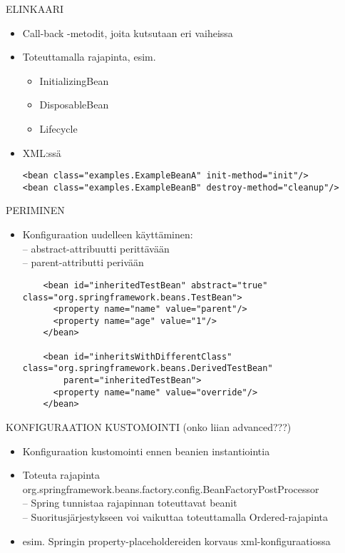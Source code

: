 \documentclass[hyperref={pdfauthor=\AUTHOR},14pt]{beamer}
\begin{document}
\begin{frame}[t, fragile]{ELINKAARI}
\begin{itemize}

 \item Call-back -metodit, joita kutsutaan eri vaiheissa
 \item Toteuttamalla rajapinta, esim.
\begin{itemize}
\item InitializingBean
\item DisposableBean
\item Lifecycle
\end{itemize}
 \item XML:ssä
\begin{lstlisting}
<bean class="examples.ExampleBeanA" init-method="init"/>
<bean class="examples.ExampleBeanB" destroy-method="cleanup"/>
\end{lstlisting}
\end{itemize}
\end{frame}
\begin{frame}[t, fragile]{PERIMINEN}
\begin{itemize}
 \item Konfiguraation uudelleen käyttäminen:\\
 -- abstract-attribuutti perittävään\\
 -- parent-attributti perivään   \\
\begin{lstlisting}
    <bean id="inheritedTestBean" abstract="true" class="org.springframework.beans.TestBean">
      <property name="name" value="parent"/>
      <property name="age" value="1"/>
    </bean>

    <bean id="inheritsWithDifferentClass" class="org.springframework.beans.DerivedTestBean"
        parent="inheritedTestBean">
      <property name="name" value="override"/>
    </bean>
\end{lstlisting}
\end{itemize}
\end{frame}
\begin{frame}[t, fragile]{KONFIGURAATION KUSTOMOINTI (onko liian advanced???)}
\begin{itemize}
 \item Konfiguraation kustomointi ennen beanien instantiointia
 \item Toteuta rajapinta org.springframework.beans.factory.config.BeanFactoryPostProcessor\\
 -- Spring tunnistaa rajapinnan toteuttavat beanit\\
 -- Suoritusjärjestykseen voi vaikuttaa toteuttamalla Ordered-rajapinta \\
 \item esim. Springin property-placeholdereiden korvaus xml-konfiguraatiossa 
\end{itemize}
\end{frame}
\end{document}

